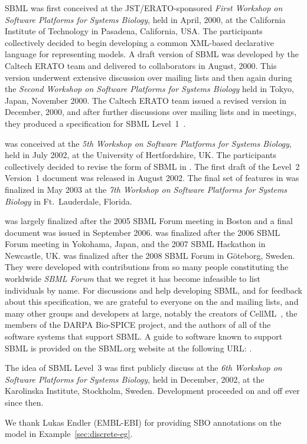 SBML was first conceived at the JST/ERATO-sponsored \emph{First
  Workshop on Software Platforms for Systems Biology}, held in
April, 2000, at the California Institute of Technology in
Pasadena, California, USA.  The participants collectively decided
to begin developing a common XML-based declarative language for
representing models.  A draft version of SBML was developed by the
Caltech ERATO team and delivered to collaborators in August, 2000.
This version underwent extensive discussion over mailing lists and
then again during the \emph{Second Workshop on Software Platforms
  for Systems Biology} held in Tokyo, Japan, November 2000.  The
Caltech ERATO team issued a revised version in December, 2000, and
after further discussions over mailing lists and in meetings, they
produced a specification for SBML Level~1~\citep{hucka:2001}.

\sbmltwo was conceived at the \emph{5th Workshop on Software
  Platforms for Systems Biology}, held in July 2002, at the
University of Hertfordshire, UK.  The participants collectively
decided to revise the form of SBML in \sbmltwo.  The first draft
of the Level~2 Version~1 document was released in August 2002. The
final set of features in \sbmltwoone was finalized in May 2003 at
the \emph{7th Workshop on Software Platforms for Systems Biology}
in Ft.\ Lauderdale, Florida.

\sbmltwotwo was largely finalized after the 2005 SBML Forum
meeting in Boston and a final document was issued in September
2006.  \sbmltwothree was finalized after the 2006 SBML Forum
meeting in Yokohama, Japan, and the 2007 SBML Hackathon in
Newcastle, UK.  \sbmltwofour was finalized after the 2008 SBML
Forum in G\"{o}teborg, Sweden.  They were developed with
contributions from so many people constituting the worldwide
\emph{SBML Forum} that we regret it has become infeasible to list
individuals by name.  For discussions and help developing SBML,
and for feedback about this specification, we are grateful to
everyone on the
 and
mailing lists, and many other groups and developers at large,
notably the creators of CellML~\citep{hedley:2001b}, the members
of the DARPA Bio-SPICE project, and the authors of all of the
software systems that support SBML.  A guide to software known to
support SBML is provided on the SBML.org website at the following
URL:
.

The idea of SBML Level~3 was first publicly discuss at
the \emph{6th Workshop on Software Platforms for Systems Biology},
held in December, 2002, at the Karolinska Institute, Stockholm,
Sweden.  Development proceeded on and off ever since then.

We thank Lukas Endler (EMBL-EBI) for providing SBO annotations on
the model in Example~\ref{sec:discrete-eg}.
